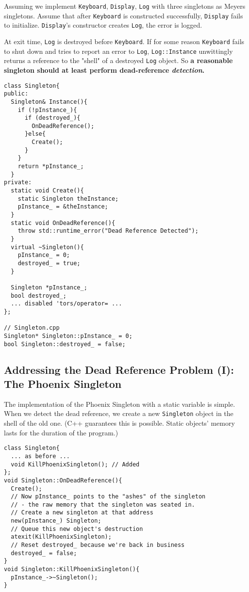 Assuming we implement \texttt{Keyboard}, \texttt{Display},
\texttt{Log} with three singletons as Meyers singletons. Assume that
after \texttt{Keyboard} is constructed successfully, \texttt{Display}
fails to initialize. \texttt{Display}'s constructor creates
\texttt{Log}, the error is logged.

At exit time,  \texttt{Log} is destroyed before \texttt{Keyboard}. If
for some reason \texttt{Keyboard} fails to shut down and tries to
report an error to \texttt{Log}, \texttt{Log::Instance} unwittingly
returns a reference to the "shell" of  a destroyed \texttt{Log}
object.  So \textbf{a reasonable singleton should at least perform
  dead-reference \emph{detection}.}

\begin{verbatim}
class Singleton{
public:
  Singleton& Instance(){
    if (!pInstance_){
      if (destroyed_){
        OnDeadReference();
      }else{
        Create();
      }
    }
    return *pInstance_;
  }
private:
  static void Create(){
    static Singleton theInstance;
    pInstance_ = &theInstance;
  }
  static void OnDeadReference(){
    throw std::runtime_error("Dead Reference Detected");
  }
  virtual ~Singleton(){
    pInstance_ = 0;
    destroyed_ = true;
  }

  Singleton *pInstance_;
  bool destroyed_;
  ... disabled 'tors/operator= ...
};

// Singleton.cpp
Singleton* Singleton::pInstance_ = 0;
bool Singleton::destroyed_ = false;
\end{verbatim}

\subsection{Addressing the Dead Reference Problem (I):
  The Phoenix Singleton}

The implementation of the Phoenix Singleton with a static variable is
simple. When we detect the dead reference, we create a new
\texttt{Singleton} object in the shell of the old one. (C++ guarantees
this is possible. Static objects' memory lasts for the duration of the
program.)

\begin{verbatim}
class Singleton{
  ... as before ...
  void KillPhoenixSingleton(); // Added
};
void Singleton::OnDeadReference(){
  Create();
  // Now pInstance_ points to the "ashes" of the singleton
  // - the raw memory that the singleton was seated in.
  // Create a new singleton at that address
  new(pInstance_) Singleton;
  // Queue this new object's destruction
  atexit(KillPhoenixSingleton);
  // Reset destroyed_ because we're back in business
  destroyed_ = false;
}
void Singleton::KillPhoenixSingleton(){
  pInstance_->~Singleton();
}
\end{verbatim}

